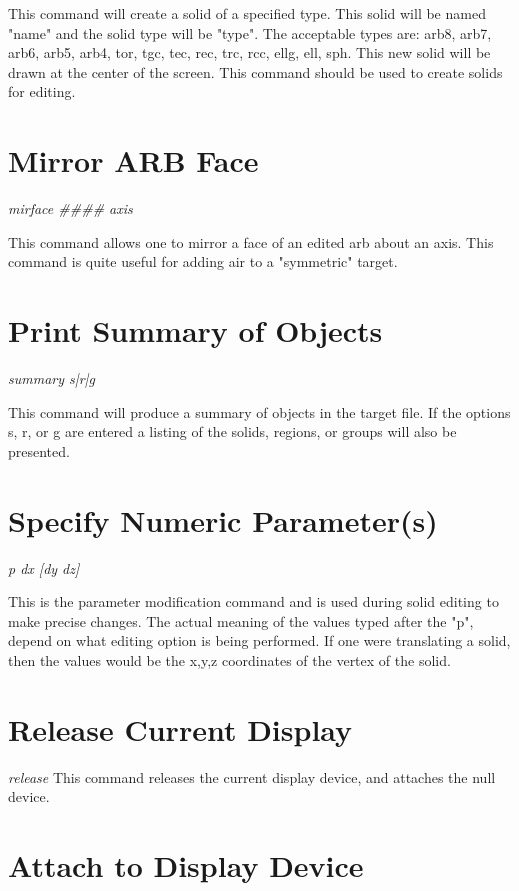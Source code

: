 This command will create a solid of a specified type.
This solid will be named "name" and the solid type will be "type".
The acceptable types are: arb8, arb7, arb6, arb5, arb4, tor, tgc, tec,
rec, trc, rcc, ellg, ell, sph.
This new solid will be drawn at the center of the screen.
This command should be used to create
solids for editing.

\section{Mirror ARB Face}

{\em \center
mirface \#\#\#\# axis
}

This command allows one to mirror a face of an edited arb about an axis.
This command is quite useful for adding air to a "symmetric" target.

\section{Print Summary of Objects}

{\em \center
summary s|r|g
}

This command will produce a summary of objects in the target file.
If the options s, r, or g are entered a listing of the solids, regions,
or groups will also be presented.

\section{Specify Numeric Parameter(s)}

{\em \center
p dx [dy dz]
}

This is the parameter modification command and is used during solid
editing to make precise changes.
The actual meaning of the values typed after the "p", depend on what
editing option is being performed.
If one were translating a solid, then the values would be the x,y,z
coordinates of the vertex of the solid.

\section{Release Current Display}

{\em \center
release
}
This command releases the current display device,
and attaches the null device.

\section{Attach to Display Device}

